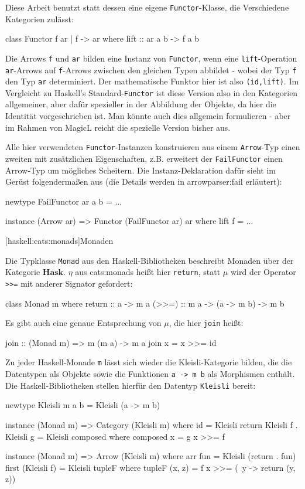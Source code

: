 \documentclass[11pt, a4paper, bibgerm]{scrbook}
\newcommand\icode[1]{\lstinline?#1?}
\newcommand\lsubsection{}
\newcommand\sref{}
\begin{document}
Diese Arbeit benutzt statt dessen eine eigene \icode{Functor}-Klasse,
die Verschiedene Kategorien zulässt:
\begin{code}
class Functor f ar | f -> ar where
  lift :: ar a b -> f a b
\end{code}
Die Arrows \icode{f} und \icode{ar} bilden eine Instanz von
\icode{Functor}, wenn eine \icode{lift}-Operation \icode{ar}-Arrows auf
\icode{f}-Arrows zwischen den gleichen Typen abbildet - wobei der Typ
\icode{f} den Typ \icode{ar} determiniert. Der mathematische Funktor
hier ist also \icode{(id,lift)}. Im Vergleicht zu Haskell's
Standard-\icode{Functor} ist diese Version also in den Kategorien
allgemeiner, aber dafür spezieller in der Abbildung der Objekte, da hier
die Identität vorgeschrieben ist. Man könnte auch dies allgemein
formulieren - aber im Rahmen von MagicL reicht die spezielle Version
bisher aus.

Alle hier verwendeten \icode{Functor}-Instanzen konstruieren aus einem
\icode{Arrow}-Typ einen zweiten mit zusätzlichen Eigenschaften,
z.B. erweitert der \icode{FailFunctor} einen Arrow-Typ um mögliches
Scheitern. Die Instanz-Deklaration dafür sieht im Gerüst folgendermaßen
aus (die Details werden in \sref{arrowparser:fail} erläutert):
\begin{code}
newtype FailFunctor ar a b = ...

instance (Arrow ar) => Functor (FailFunctor ar) ar where
  lift f = ...
\end{code}

\lsubsection[haskell:cats:monads]{Monaden}

Die Typklasse \icode{Monad} aus den Haskell-Bibliotheken beschreibt
Monaden über der Kategorie $\mathbf{Hask}$. $\eta$ aus
\sref{cats:monads} heißt hier \icode{return}, statt $\mu$ wird der
Operator \icode{>>=} %
mit anderer Signator gefordert:
\begin{code}
class Monad m where
  return :: a -> m a
  (>>=)  :: m a -> (a -> m b) -> m b
\end{code} %
Es gibt auch eine genaue Entsprechung von $\mu$, die hier \icode{join}
heißt:
\begin{code}
join :: (Monad m) => m (m a) -> m a
join x = x >>= id
\end{code} %

Zu jeder Haskell-Monade \icode{m} lässt sich wieder die
Kleisli-Kategorie bilden, die die Datentypen als Objekte sowie die
Funktionen \icode{a -> m b} als Morphismen enthält. Die
Haskell-Bibliotheken stellen hierfür den Datentyp \icode{Kleisli}
bereit:
\begin{code}
newtype Kleisli m a b = Kleisli (a -> m b)

instance (Monad m) => Category (Kleisli m)
  where id = Kleisli return
        Kleisli f . Kleisli g = Kleisli composed
          where composed x = g x >>= f

instance (Monad m) => Arrow (Kleisli m)
  where arr fun = Kleisli (return . fun)
        first (Kleisli f) = Kleisli tupleF
          where tupleF (x, z) = f x >>= (\ y -> return (y, z))
\end{code} %
\end{document}
